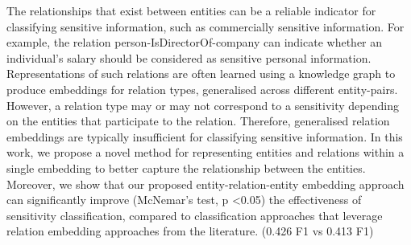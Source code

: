 The relationships that exist between entities can be a reliable indicator for classifying sensitive information, such as commercially sensitive information. For example, the relation person-IsDirectorOf-company can indicate whether an individual's salary should be considered as sensitive personal information. Representations of such relations are often learned using a knowledge graph to produce embeddings for relation types, generalised across different entity-pairs. However, a relation type may or may not correspond to a sensitivity depending on the entities that participate to the relation. Therefore, generalised relation embeddings are typically insufficient for classifying sensitive information. In this work, we propose a novel method for representing entities and relations within a single embedding to better capture the relationship between the entities. Moreover, we show that our proposed entity-relation-entity embedding approach can significantly improve (McNemar's test, p <0.05) the effectiveness of sensitivity classification, compared to classification approaches that leverage relation embedding approaches from the literature. (0.426 F1 vs 0.413 F1)
